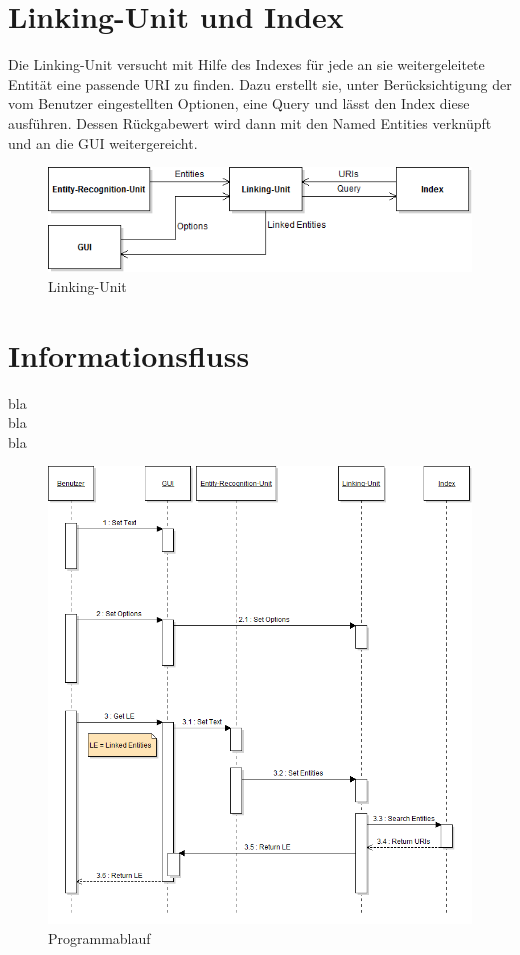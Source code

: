 \documentclass[11pt, a4paper, oneside]{Thesis} %
\begin{document}
\section{Linking-Unit und Index}
Die Linking-Unit versucht mit Hilfe des Indexes f\"ur jede an sie weitergeleitete Entit\"at eine passende URI zu finden. Dazu erstellt sie, unter Ber\"ucksichtigung der vom Benutzer eingestellten Optionen, eine Query und l\"asst den Index diese ausf\"uhren. Dessen R\"uckgabewert wird dann mit den Named Entities verkn\"upft und an die GUI weitergereicht.
\begin{figure}[ht!]
\centering
\includegraphics[scale=0.55]{./linking.png}
\caption[Linking Unit]{Linking-Unit}
\end{figure}
\section{Informationsfluss}
bla \\
bla\\
bla
\begin{figure}[ht!]
\centering
\includegraphics[scale=0.55]{./seq.png}
\caption[Programmablauf]{Programmablauf}
\end{figure}
\end{document}
